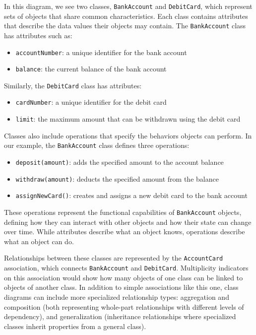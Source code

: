 In this diagram, we see two classes, \texttt{BankAccount} and \texttt{DebitCard}, 
which represent sets of objects that share common characteristics. Each class 
contains attributes that describe the data values their objects may contain. 
The \texttt{BankAccount} class has attributes such as:
\begin{itemize}
    \item \texttt{accountNumber}: a unique identifier for the bank account
    \item \texttt{balance}: the current balance of the bank account
\end{itemize}
Similarly, the \texttt{DebitCard} class has attributes:
\begin{itemize}
    \item \texttt{cardNumber}: a unique identifier for the debit card
    \item \texttt{limit}: the maximum amount that can be withdrawn using the debit card
\end{itemize}

Classes also include operations that specify the behaviors objects can perform. 
In our example, the \texttt{BankAccount} class defines three operations:
\begin{itemize}
    \item \texttt{deposit(amount)}: adds the specified amount to the account balance
    \item \texttt{withdraw(amount)}: deducts the specified amount from the balance
    \item \texttt{assignNewCard()}: creates and assigns a new debit card to the bank account
\end{itemize}
These operations represent the functional capabilities of \texttt{BankAccount} objects, 
defining how they can interact with other objects and how their state can change over 
time. While attributes describe what an object knows, operations describe what an 
object can do.

Relationships between these classes are represented by the \texttt{AccountCard} 
association, which connects \texttt{BankAccount} and \texttt{DebitCard}. 
Multiplicity indicators on this association would show how many objects of one class 
can be linked to objects of another class. In addition to simple associations like 
this one, class diagrams can include more specialized relationship types: aggregation 
and composition (both representing whole-part relationships with different levels of 
dependency), and generalization (inheritance relationships where specialized classes 
inherit properties from a general class).

